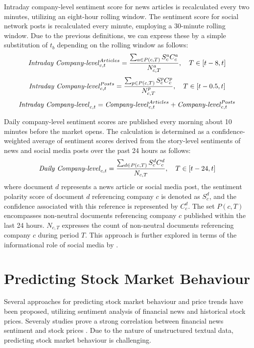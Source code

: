 Intraday company-level sentiment score for news articles is recalculated every two minutes, utilizing an eight-hour rolling window. The sentiment score for social network posts is recalculated every minute, employing a 30-minute rolling window. Due to the previous definitions, we can express these by a simple substitution of $t_{b}$ depending on the rolling window as follows:
\begin{equation}
    \label{eq:intraday-company-level-article-sentiment}
    \text{\textit{Intraday Company-level}}_{c,t}^{Articles} = \frac{\sum_{a \in P(c,T)} S_{c}^{a} C_{c}^{a}}{N_{c,T}^{a}}, \quad T \in [t-8, t]
\end{equation}
\begin{equation}
    \label{eq:intraday-company-level-post-sentiment}
    \text{\textit{Intraday Company-level}}_{c,t}^{Posts} = \frac{\sum_{p \in P(c,T)} S_{c}^{p} C_{c}^{p}}{N_{c,T}^{p}}, \quad T \in [t-0.5, t]
\end{equation}
\begin{equation}
    \label{eq:intraday-company-level-sentiment}
    \text{\textit{Intraday Company-level}}_{c,t} = \text{\textit{Company-level}}_{c,t}^{Articles} + \text{\textit{Company-level}}_{c,t}^{Posts}
\end{equation}

Daily company-level sentiment scores are published every morning about 10 minutes before the market opens. The calculation is determined as a confidence-weighted average of sentiment scores derived from the story-level sentiments of news and social media posts over the past 24 hours as follows:
\begin{equation}
    \label{eq:daily-company-level-sentiment}
    \text{\textit{Daily Company-level}}_{c,t} = \frac{\sum_{d \in P(c,T)} S_{c}^{d} C_{c}^{d}}{N_{c,T}}, \quad T \in [t-24, t]
\end{equation} where document $d$ represents a news article or social media post, the sentiment polarity score of document $d$ referencing company $c$ is denoted as $S_{c}^{d}$, and the confidence associated with this reference is represented by $C_{c}^{d}$. The set $P(c,T)$ encompasses non-neutral documents referencing company $c$ published within the last 24 hours. $N_{c,T}$ expresses the count of non-neutral documents referencing company $c$ during period $T$. This approach is further explored in terms of the informational role of social media by \textcite{chenInformationalRole}.

\section{Predicting Stock Market Behaviour}
\label{sec:predicting-stock-market-behaviour}
Several approaches for predicting stock market behaviour and price trends have been proposed, utilizing sentiment analysis of financial news and historical stock prices. Severaly studies prove a strong correlation between financial news sentiment and stock prices \parencite{li2014newsimpact} \parencite{Wan2021}. Due to the nature of unstructured textual data, predicting stock market behaviour is challenging.

